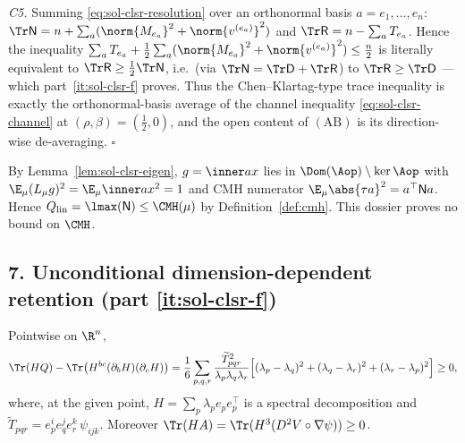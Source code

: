 \documentclass[../main.tex]{subfiles}
\begin{document}
\emph{C5.}  Summing \eqref{eq:sol-clsr-resolution} over an orthonormal basis
$a=e_1,\dots,e_n$:
$\Tr\mathsf N=n+\sum_a(\norm{M_{e_a}}^2+\norm{v^{(e_a)}}^2)$ and
$\Tr\mathsf R=n-\sum_aT_{e_a}$.  Hence the inequality
$\sum_aT_{e_a}+\tfrac12\sum_a(\norm{M_{e_a}}^2+\norm{v^{(e_a)}}^2)\le\tfrac n2$ is literally
equivalent to $\Tr\mathsf R\ge\tfrac12\Tr\mathsf N$, i.e.\ (via
$\Tr\mathsf N=\Tr\mathsf D+\Tr\mathsf R$) to $\Tr\mathsf R\ge\Tr\mathsf D$ --- which
part~\ref{it:sol-clsr-f} proves.  Thus the Chen--Klartag-type trace inequality is exactly the
orthonormal-basis average of the channel inequality \eqref{eq:sol-clsr-channel} at
$(\rho,\beta)=(\tfrac12,0)$, and the open content of $(\mathrm{AB})$ is its direction-wise
de-averaging. \hfill$\square$

\begin{remark}
\label{rem:sol-clsr-qlin-cmh}
By Lemma~\ref{lem:sol-clsr-eigen}, $g=\inner ax$ lies in $\Dom(\Aop)\setminus\ker\Aop$ with
$\E_\mu(L_\mu g)^2=\E_\mu\inner ax^2=1$ and CMH numerator
$\E_\mu\abs{\tau a}^2=a^\top\mathsf Na$.  Hence
$Q_{\mathrm{lin}}=\lmax(\mathsf N)\le\CMH(\mu)$ by Definition~\ref{def:cmh}.  This dossier
proves no bound on $\CMH$.
\end{remark}

\subsection*{7. Unconditional dimension-dependent retention (part \ref{it:sol-clsr-f})}

\begin{lemma}
\label{lem:sol-clsr-cyclic}
Pointwise on $\R^n$,
\[
  \Tr(HQ)-\Tr\bigl(H^{bc}(\partial_bH)(\partial_cH)\bigr)
  =\frac16\sum_{p,q,r}\frac{\widetilde T_{pqr}^2}{\lambda_p\lambda_q\lambda_r}
   \Bigl[(\lambda_p-\lambda_q)^2+(\lambda_q-\lambda_r)^2+(\lambda_r-\lambda_p)^2\Bigr]\ge0,
\]
where, at the given point, $H=\sum_p\lambda_pe_pe_p^\top$ is a spectral decomposition and
$\widetilde T_{pqr}=e_p^ie_q^je_r^k\,\psi_{ijk}$.  Moreover $\Tr(HA)=\Tr(H^3(D^2V\circ\nabla\psi))\ge0$.
\end{lemma}
\end{document}
